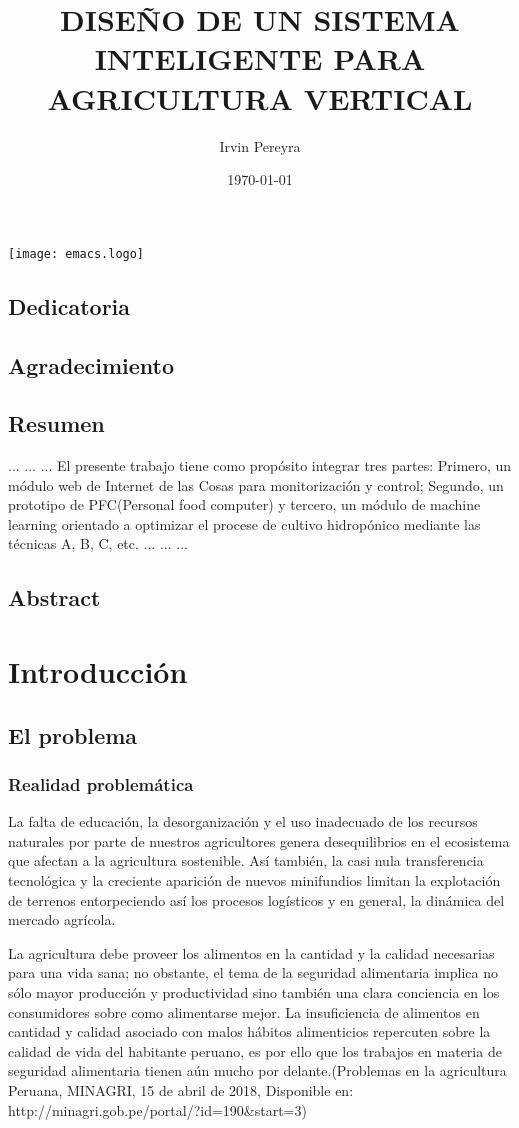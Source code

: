 \documentclass{report}
\title{DISEÑO DE UN SISTEMA INTELIGENTE PARA AGRICULTURA VERTICAL}
\author{Irvin Pereyra}
\date{\today}
\begin{document}
\maketitle
\texttt{[image: emacs.logo]}
\section{Dedicatoria}
\section{Agradecimiento}
\tableofcontents
\newpage
{}
\section{Resumen}
...
...
...
El presente trabajo tiene como propósito integrar tres partes: Primero, un
módulo web de Internet de las Cosas para monitorización y control; Segundo, un
prototipo de PFC(Personal food computer) y tercero, un módulo de machine
learning orientado a optimizar el procese de cultivo hidropónico mediante las
técnicas A, B, C, etc.
...
...
...
\section{Abstract}

\chapter{Introducción}
\section{El problema}
\subsection{Realidad problemática}

La falta de educación, la desorganización y el uso inadecuado de los recursos
naturales por parte de nuestros agricultores genera desequilibrios en el
ecosistema que afectan a la agricultura sostenible. Así también, la casi nula
transferencia tecnológica y la creciente aparición de nuevos minifundios limitan
la explotación de terrenos entorpeciendo así los procesos logísticos y en
general, la dinámica del mercado agrícola.

La agricultura debe proveer los alimentos en la cantidad y la calidad necesarias
para una vida sana; no obstante, el tema de la seguridad alimentaria implica no
sólo mayor producción y productividad sino también una clara conciencia en los
consumidores sobre como alimentarse mejor. La insuficiencia de alimentos en
cantidad y calidad asociado con malos hábitos alimenticios repercuten sobre la
calidad de vida del habitante peruano, es por ello que los trabajos en materia
de seguridad alimentaria tienen aún mucho por delante.(Problemas en la
agricultura Peruana, MINAGRI, 15 de abril de 2018,  Disponible en:
http://minagri.gob.pe/portal/?id=190&start=3)
\end{document}
